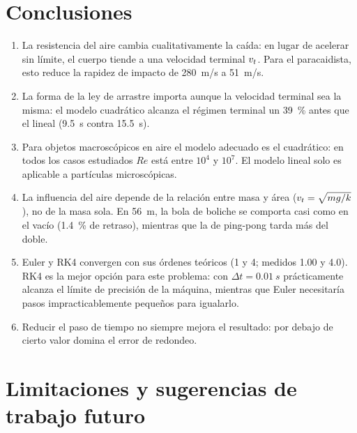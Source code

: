 \section{Conclusiones}

\begin{enumerate}
  \item La resistencia del aire cambia cualitativamente la caída: en lugar de acelerar sin límite, el cuerpo tiende a una velocidad terminal $v_t$. Para el paracaidista, esto reduce la rapidez de impacto de \qty{280}{m/s} a \qty{51}{m/s}.
  \item La forma de la ley de arrastre importa aunque la velocidad terminal sea la misma: el modelo cuadrático alcanza el régimen terminal un \qty{39}{\percent} antes que el lineal (\qty{9.5}{s} contra \qty{15.5}{s}).
  \item Para objetos macroscópicos en aire el modelo adecuado es el cuadrático: en todos los casos estudiados $Re$ está entre $10^4$ y $10^7$. El modelo lineal solo es aplicable a partículas microscópicas.
  \item La influencia del aire depende de la relación entre masa y área ($v_t = \sqrt{mg/k}$), no de la masa sola. En \qty{56}{m}, la bola de boliche se comporta casi como en el vacío (\qty{1.4}{\percent} de retraso), mientras que la de ping-pong tarda más del doble.
  \item Euler y RK4 convergen con sus órdenes teóricos (1 y 4; medidos 1.00 y 4.0). RK4 es la mejor opción para este problema: con $\Delta t = \qty{0.01}{s}$ prácticamente alcanza el límite de precisión de la máquina, mientras que Euler necesitaría pasos impracticablemente pequeños para igualarlo.
  \item Reducir el paso de tiempo no siempre mejora el resultado: por debajo de cierto valor domina el error de redondeo.
\end{enumerate}

\section{Limitaciones y sugerencias de trabajo futuro}

